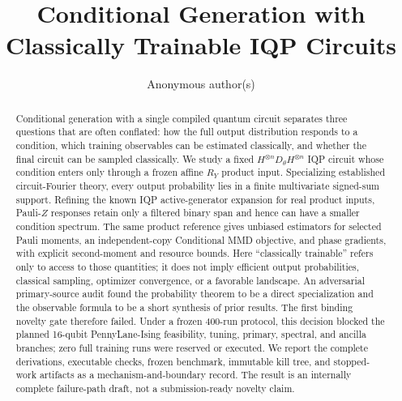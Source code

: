\documentclass[a4paper,twocolumn,11pt,unpublished]{quantumarticle}
\title{Conditional Generation with Classically Trainable IQP Circuits}
\author{Anonymous author(s)}
\affiliation{Internal research draft; author metadata withheld pending a submission decision}
\begin{document}
\maketitle

\begin{abstract}
Conditional generation with a single compiled quantum circuit separates three
questions that are often conflated: how the full output distribution responds
to a condition, which training observables can be estimated classically, and
whether the final circuit can be sampled classically.  We study a fixed
$H^{\otimes n}D_\theta H^{\otimes n}$ IQP circuit whose condition enters only
through a frozen affine $R_Y$ product input.  Specializing
established circuit-Fourier theory, every output probability lies in a finite
multivariate signed-sum support.  Refining the known IQP active-generator
expansion for real product inputs, Pauli-$Z$ responses retain only a filtered
binary span and hence can have a smaller condition spectrum.  The same product
reference gives unbiased estimators for selected Pauli moments, an
independent-copy Conditional MMD objective, and phase gradients, with explicit
second-moment and resource bounds.  Here ``classically trainable'' refers only
to access to those quantities; it does not imply efficient output
probabilities, classical sampling, optimizer convergence, or a favorable
landscape.  An adversarial primary-source audit found the probability theorem
to be a direct specialization and the observable formula to be a short
synthesis of prior results.  The first binding novelty gate therefore failed.
Under a frozen 400-run protocol, this decision blocked the planned 16-qubit
PennyLane-Ising feasibility, tuning, primary, spectral, and ancilla branches;
zero full training runs were reserved or executed.  We report the complete
derivations, executable checks, frozen benchmark, immutable kill tree, and
stopped-work artifacts as a mechanism-and-boundary record.  The result is an
internally complete failure-path draft, not a submission-ready novelty claim.
\end{abstract}

\begin{center}
\end{center}
\end{document}
